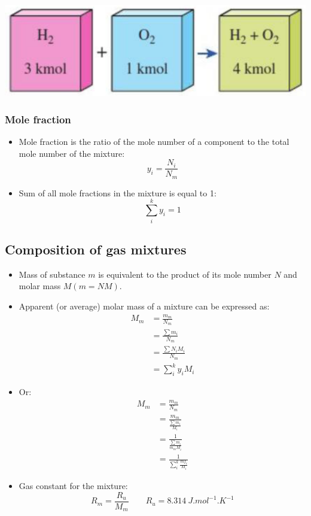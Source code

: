 \documentclass[11pt]{article}
\begin{document}
\begin{center}
\includegraphics[width=.9\linewidth]{./images/molar-analysis.png}
\end{center}

\subsubsection{Mole fraction}
\label{sec:org935ac7e}
\begin{itemize}
\item Mole fraction is the ratio of the mole number of a component to the total mole number of the mixture:
\[y_i = \frac{N_i}{N_m}\]
\item Sum of all mole fractions in the mixture is equal to 1:
\[\sum_i^k y_i = 1\]
\end{itemize}

\subsection{Composition of gas mixtures}
\label{sec:org5be822d}
\begin{itemize}
\item Mass of substance \(m\) is equivalent to the product of its mole number \(N\) and molar mass \(M (m = NM)\).
\item Apparent (or average) molar mass of a mixture can be expressed as:
\begin{align*}
M_m &= \frac{m_m}{N_m} \\
&= \frac{\sum m_i}{N_m} \\
&= \frac{\sum N_i M_i}{N_m} \\
&= \sum_i^k y_i M_i
\end{align*}
\item Or:
\begin{align*}
M_m &= \frac{m_m}{N_m} \\
&= \frac{m_m}{\frac{\sum m_i}{M_i}} \\
&= \frac{1}{\frac{\sum m_i}{m_m M_i}} \\
&= \frac{1}{\sum_i^k \frac{mf_i}{M_i}}
\end{align*}
\item Gas constant for the mixture:
\[R_m = \frac{R_u}{M_m} \qquad R_u = \qty{8.314}{J.mol^{-1}.K^{-1}}\]
\end{itemize}
\end{document}
